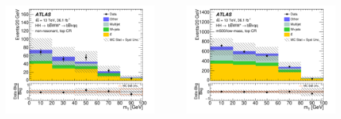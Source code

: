 \documentclass{beamer}
\newcommand*{\header}[1]{\fontsize{16}{8}\selectfont \textbf{{\color{MyPurple}{#1}}}}
\begin{document}
\begin{frame}
\begin{center}
\header{mBBcr}
\end{center}
\vspace{-0.5cm}
\begin{columns}
\begin{column}{0.5\textwidth}
\begin{center}
\includegraphics[width=0.9\textwidth]{figures/C_mBBcr_reOptNonRes_mww_bbpt210_bbpt300_wlepmtben_regionA_met25d020-eps-converted-to}
\end{center}
\end{column}
\begin{column}{0.5\textwidth}
\begin{center}
\includegraphics[width=0.9\textwidth]{figures/C_mBBcr_reOpt700_mww_bbpt210_wlepmtben_regionA_met25d020-eps-converted-to}
\end{center}
\end{column}

\end{columns}
\end{frame}
\end{document}
